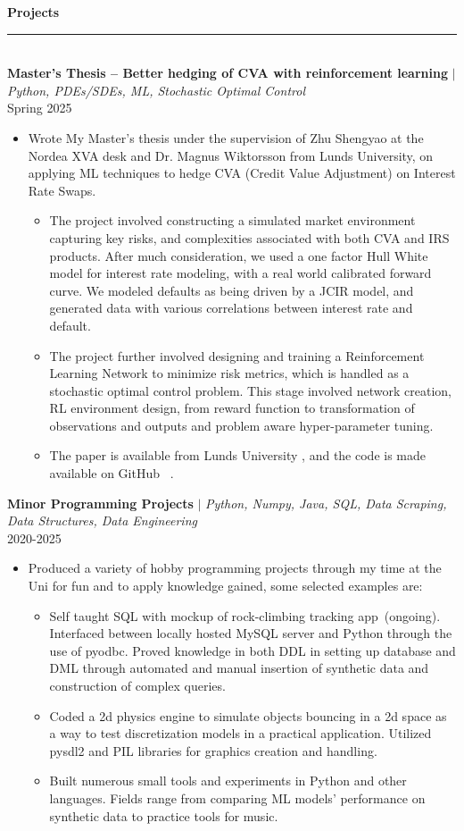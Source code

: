 \documentclass[10pt, a4paper, english]{article}
\newcommand{\smallgit}[1]{~\href{#1}{\faGithub} }
\def\MastersTitle{Master's Thesis -- Better hedging of CVA with reinforcement learning}%
\newcommand{\mysection}[1]{\color{black}\textbf{\LARGE{#1}}\\
				        \rule[1em]{\widthof{\textbf{\LARGE{#1}}}}{1.333pt} \color{darkgray!80!black}\\ \vspace{-1em}}
\newcommand{\PExperience}[3]{\normalsize \noindent \textbf{#1} $\vert$ \textit{\footnotesize#3} \hfil \\ #2 \vspace{-0.25em}}
\begin{document}
\newpage
{}
\raggedright
\mysection{Projects}
\PExperience{\MastersTitle}{Spring 2025}{Python, PDEs/SDEs, ML, Stochastic Optimal Control}
\begin{itemize}
\item Wrote My Master's thesis under the supervision of Zhu Shengyao at the Nordea XVA desk and Dr. Magnus Wiktorsson from Lunds University, on applying ML techniques to hedge CVA (Credit Value Adjustment) on Interest Rate Swaps.
	\begin{itemize} 
		\item The project involved constructing a simulated market environment capturing key risks, and complexities associated with both CVA and IRS products. After much consideration, we used a one factor Hull White model for interest rate 		modeling, with a real world calibrated forward curve. We modeled defaults as being driven by a JCIR model, and generated data with various correlations between interest rate and default.
		\item The project further involved designing and training a Reinforcement Learning Network to minimize risk metrics, which is handled as a stochastic optimal control problem. This stage involved network creation, RL environment design, from reward function to transformation of observations and outputs and problem aware hyper-parameter tuning.
		\item The paper is available from Lunds University \href{http://lup.lub.lu.se/student-papers/record/9197473}{ \scriptsize \faLink}, and the code is made available on GitHub\smallgit{https://github.com/Squid-oid/cva_risk_management_thesis}.
	\end{itemize}
\end{itemize}

\PExperience{Minor Programming Projects}{2020-2025}{Python, Numpy, Java, SQL, Data Scraping, Data Structures, Data Engineering}
\begin{itemize}
\item Produced a variety of hobby programming projects through my time at the Uni for fun and to apply knowledge gained, some selected examples are:
	\begin{itemize}\normalsize 
		\item Self taught SQL with mockup of rock-climbing tracking app~(ongoing). Interfaced between locally hosted MySQL server and Python through the use of pyodbc. Proved knowledge in both DDL in setting up database and DML through 				automated and manual insertion of synthetic data and construction of complex queries. \smallgit{https://github.com/Squid-oid/SQL}
		\item Coded a 2d physics engine to simulate objects bouncing in a 2d space as a way to test discretization models in a practical application. Utilized pysdl2 and PIL libraries for graphics creation and handling. \smallgit{https://github.com/Squid-oid/physics-fun}
		\item Built numerous small tools and experiments in Python and other languages. Fields range from comparing ML models' performance on synthetic data to practice tools for music.
	\end{itemize}
\end{itemize}
\end{document}
